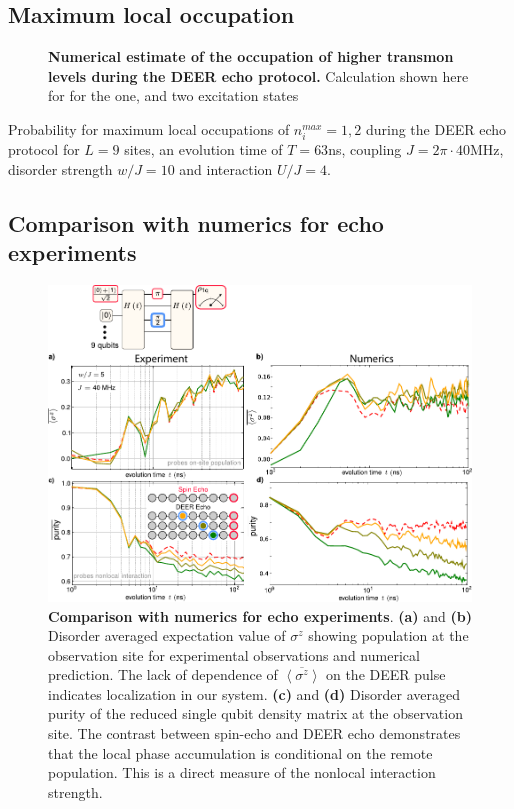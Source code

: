\subsection{Maximum local occupation}
\begin{figure}
\centering
{}
\caption{\textbf{Numerical estimate of the occupation of higher transmon levels during the DEER echo protocol.} Calculation shown here for for the one, and two excitation states}
\label{figLocalOcc}
\end{figure}
Probability for maximum local occupations of $n_i^{max} = 1,2$ during the DEER echo protocol for $L=9$ sites, an evolution time of $T=63$ns, coupling $J=2\pi \cdot 40$MHz, disorder strength $w/J=10$ and interaction $U/J=4$.

\subsection{Comparison with numerics for echo experiments}
\begin{figure}
\centering
\includegraphics[width=140mm, keepaspectratio]{./PDF/echo_numerics_comparison_190919_944a.pdf}
\caption{\textbf{Comparison with numerics for echo experiments}.
\textbf{(a)} and \textbf{(b)} Disorder averaged expectation value of $\sigma^z$ showing population at the observation site for experimental observations and numerical prediction.
The lack of dependence of $\overline{ \left< \sigma^z \right> }$ on the DEER pulse indicates localization in our system.
\textbf{(c)} and \textbf{(d)} Disorder averaged purity of the reduced single qubit density matrix at the observation site.
The contrast between spin-echo and DEER echo demonstrates that the local phase accumulation is conditional on the remote population.
This is a direct measure of the nonlocal interaction strength.}
    \label{echo_numerics}
\end{figure}

